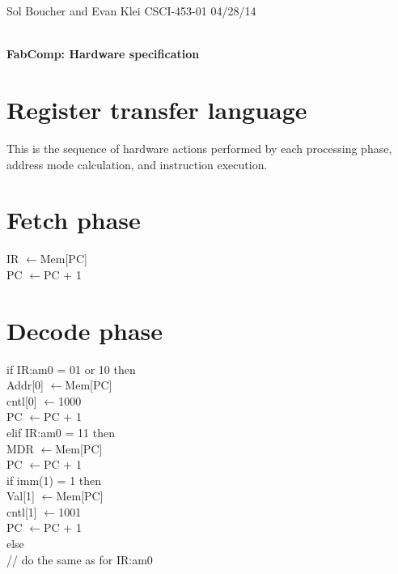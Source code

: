 \documentclass[12pt]{article}
\newcommand{\get}{$\leftarrow$}
\begin{document}
\setlength{\parindent}{0pt}

\begin{framed}
Sol Boucher and Evan Klei \hfill CSCI-453-01 \hfill 04/28/14 \\
\vspace{6pt} \\
\centerline{\textbf{\huge FabComp: Hardware specification}}
\end{framed}

\section{Register transfer language}
This is the sequence of hardware actions performed by each processing phase, address mode calculation, and instruction execution.

\section{Fetch phase}
IR \get Mem[PC] \\
PC \get PC + 1

\section{Decode phase}
if IR:am0 = 01 or 10 then \\
\indent Addr[0] \get Mem[PC] \\
\indent cntl[0] \get 1000 \\
\indent PC \get PC + 1 \\
elif IR:am0 = 11 then \\
\indent MDR \get Mem[PC] \\
\indent PC \get PC + 1 \\

if imm(1) = 1 then \\
\indent Val[1] \get Mem[PC] \\
\indent cntl[1] \get 1001 \\
\indent PC \get PC + 1 \\
else \\
\indent // do the same as for IR:am0

\end{document}
